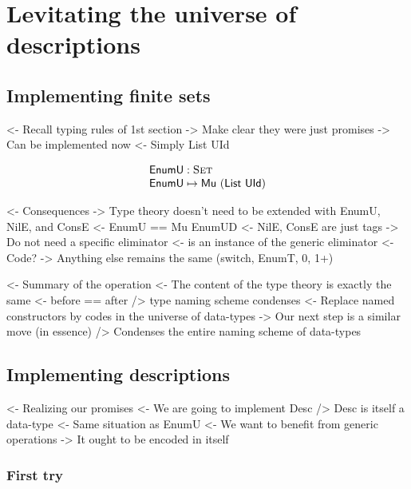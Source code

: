 \section{Levitating the universe of descriptions}

\subsection{Implementing finite sets}

\begin{structure}
<- Recall typing rules of 1st section
    -> Make clear they were just promises
    -> Can be implemented now
        <- Simply List UId
\end{structure}

\[\stk{
\EnumU : \Set \\
\EnumU \mapsto \Mu{(\List~\UId)}
}\]


\begin{structure}
<- Consequences
    -> Type theory doesn't need to be extended with EnumU, NilE, and ConsE
        <- EnumU == Mu EnumUD
        <- NilE, ConsE are just tags
    -> Do not need a specific \spi eliminator
        <- \spi is an instance of the generic eliminator
            <- Code?
    -> Anything else remains the same (switch, EnumT, 0, 1+)
\end{structure}

\begin{structure}
<- Summary of the operation
    <- The content of the type theory is exactly the same
        <- before == after
    /> type naming scheme condenses
        <- Replace named constructors by codes in the universe of data-types
    -> Our next step is a similar move (in essence)
        /> Condenses the entire naming scheme of data-types
\end{structure}

\subsection{Implementing descriptions}

\begin{structure}
<- Realizing our promises
    <- We are going to implement Desc
    /> Desc is itself a data-type
        <- Same situation as EnumU
            <- We want to benefit from generic operations
        -> It ought to be encoded in itself
\end{structure}

\subsubsection{First try}

